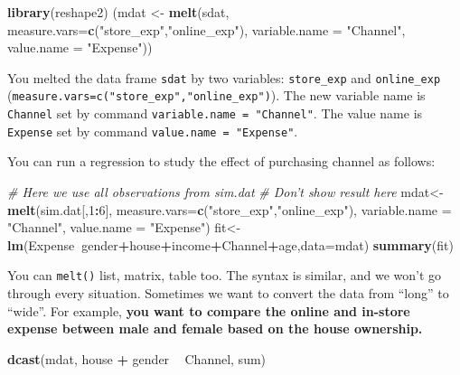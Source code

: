 \documentclass[12pt,]{krantz}
\makeatletter
\newenvironment{Shaded}{\begin{snugshade}}{\end{snugshade}}
\newcommand{\KeywordTok}[1]{\textcolor[rgb]{0.27,0.27,0.27}{\textbf{#1}}}
\newcommand{\DataTypeTok}[1]{\textcolor[rgb]{0.27,0.27,0.27}{#1}}
\newcommand{\DecValTok}[1]{\textcolor[rgb]{0.06,0.06,0.06}{#1}}
\newcommand{\StringTok}[1]{\textcolor[rgb]{0.5,0.5,0.5}{#1}}
\newcommand{\CommentTok}[1]{\textcolor[rgb]{0.37,0.37,0.37}{\textit{#1}}}
\newcommand{\OperatorTok}[1]{\textcolor[rgb]{0.43,0.43,0.43}{\textbf{#1}}}
\newcommand{\NormalTok}[1]{#1}
\newenvironment{kframe}{%
\medskip{}
\setlength{\fboxsep}{.8em}
 \def\at@end@of@kframe{}%
 \ifinner\ifhmode%
  \def\at@end@of@kframe{\end{minipage}}%
  \begin{minipage}{\columnwidth}%
 \fi\fi%
 \def\FrameCommand##1{\hskip\@totalleftmargin \hskip-\fboxsep
 \colorbox{shadecolor}{##1}\hskip-\fboxsep
     \hskip-\linewidth \hskip-\@totalleftmargin \hskip\columnwidth}%
 \MakeFramed {\advance\hsize-\width
   \@totalleftmargin\z@ \linewidth\hsize
   \@setminipage}}%
 {\par\unskip\endMakeFramed%
 \at@end@of@kframe}
\renewenvironment{Shaded}{\begin{kframe}}{\end{kframe}}
\theoremstyle{definition}
\theoremstyle{definition}
\theoremstyle{definition}
\theoremstyle{remark}
\makeatother
\begin{document}
\begin{Shaded}
\begin{Highlighting}[]
\KeywordTok{library}\NormalTok{(reshape2)}
\NormalTok{(mdat <-}\StringTok{ }\KeywordTok{melt}\NormalTok{(sdat, }\DataTypeTok{measure.vars=}\KeywordTok{c}\NormalTok{(}\StringTok{"store_exp"}\NormalTok{,}\StringTok{"online_exp"}\NormalTok{),}
              \DataTypeTok{variable.name =} \StringTok{"Channel"}\NormalTok{,}
              \DataTypeTok{value.name =} \StringTok{"Expense"}\NormalTok{))}
\end{Highlighting}
\end{Shaded}

You melted the data frame \texttt{sdat} by two variables:
\texttt{store\_exp} and \texttt{online\_exp}
(\texttt{measure.vars=c("store\_exp","online\_exp")}). The new variable
name is \texttt{Channel} set by command
\texttt{variable.name\ =\ "Channel"}. The value name is \texttt{Expense}
set by command \texttt{value.name\ =\ "Expense"}.

You can run a regression to study the effect of purchasing channel as
follows:

\begin{Shaded}
\begin{Highlighting}[]
\CommentTok{# Here we use all observations from sim.dat}
\CommentTok{# Don't show result here}
\NormalTok{mdat<-}\KeywordTok{melt}\NormalTok{(sim.dat[,}\DecValTok{1}\OperatorTok{:}\DecValTok{6}\NormalTok{], }\DataTypeTok{measure.vars=}\KeywordTok{c}\NormalTok{(}\StringTok{"store_exp"}\NormalTok{,}\StringTok{"online_exp"}\NormalTok{),}
            \DataTypeTok{variable.name =} \StringTok{"Channel"}\NormalTok{,}
              \DataTypeTok{value.name =} \StringTok{"Expense"}\NormalTok{)}
\NormalTok{fit<-}\KeywordTok{lm}\NormalTok{(Expense}\OperatorTok{~}\NormalTok{gender}\OperatorTok{+}\NormalTok{house}\OperatorTok{+}\NormalTok{income}\OperatorTok{+}\NormalTok{Channel}\OperatorTok{+}\NormalTok{age,}\DataTypeTok{data=}\NormalTok{mdat)}
\KeywordTok{summary}\NormalTok{(fit)}
\end{Highlighting}
\end{Shaded}

You can \texttt{melt()} list, matrix, table too. The syntax is similar,
and we won't go through every situation. Sometimes we want to convert
the data from ``long'' to ``wide''. For example, \textbf{you want to
compare the online and in-store expense between male and female based on
the house ownership. }

\begin{Shaded}
\begin{Highlighting}[]
\KeywordTok{dcast}\NormalTok{(mdat, house }\OperatorTok{+}\StringTok{ }\NormalTok{gender }\OperatorTok{~}\StringTok{ }\NormalTok{Channel, sum)}
\end{Highlighting}
\end{Shaded}
\end{document}
